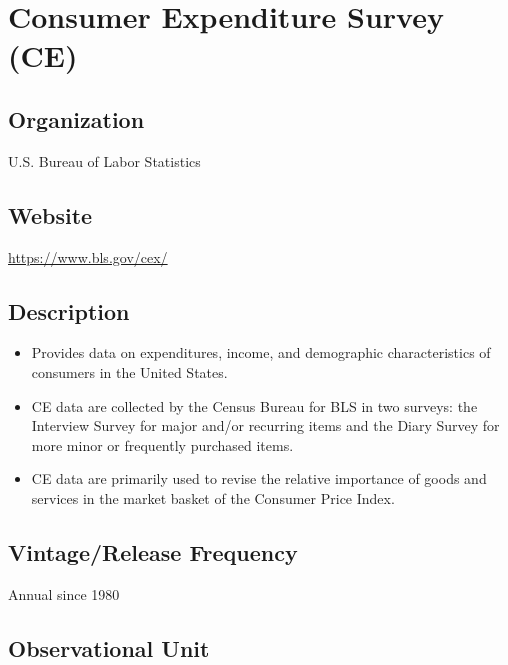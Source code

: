 \documentclass[
]{book}
\providecommand{\tightlist}{%
  \setlength{\itemsep}{0pt}\setlength{\parskip}{0pt}}
\begin{document}
\hypertarget{consumer-expenditure-survey-ce}{%
\chapter{Consumer Expenditure Survey (CE)}\label{consumer-expenditure-survey-ce}}

\hypertarget{organization-18}{%
\section{Organization}\label{organization-18}}

U.S. Bureau of Labor Statistics

\hypertarget{website-18}{%
\section{Website}\label{website-18}}

\url{https://www.bls.gov/cex/}

\hypertarget{description-18}{%
\section{Description}\label{description-18}}

\begin{itemize}
\tightlist
\item
  Provides data on expenditures, income, and demographic characteristics of consumers in the United States.
\item
  CE data are collected by the Census Bureau for BLS in two surveys: the Interview Survey for major and/or recurring items and the Diary Survey for more minor or frequently purchased items.
\item
  CE data are primarily used to revise the relative importance of goods and services in the market basket of the Consumer Price Index.
\end{itemize}

\hypertarget{vintagerelease-frequency-18}{%
\section{Vintage/Release Frequency}\label{vintagerelease-frequency-18}}

Annual since 1980

\hypertarget{observational-unit-18}{%
\section{Observational Unit}\label{observational-unit-18}}
\end{document}
